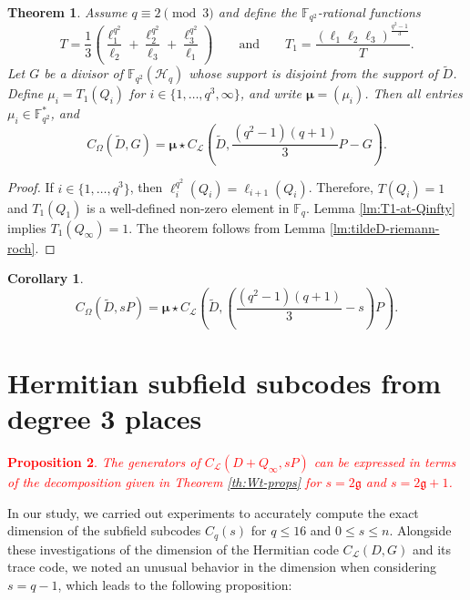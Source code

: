 \documentclass[11pt]{amsart}
\theoremstyle{plain}
\newtheorem{theorem}{Theorem}[section]
\newtheorem{proposition}[theorem]{Proposition}
\newtheorem*{corollary}{Corollary}
\theoremstyle{definition}
\theoremstyle{remark}
\newcommand{\g}{\mathfrak{g}}
\begin{document}
\begin{theorem}
Assume $q\equiv 2 \pmod3$ and define the $\mathbb{F}_{q^2}$-rational functions 
\[T=\frac{1}{3}\left(\frac{\ell_1^{q^2}}{\ell_2} + \frac{\ell_2^{q^2}}{\ell_3} + \frac{\ell_3^{q^2}}{\ell_1}\right) \qquad \text{and} \qquad T_1=\frac{(\ell_1\ell_{2}\ell_{3})^{\frac{q^2-1}{3}}}{T}.\]
Let $G$ be a divisor of $\mathbb{F}_{q^2}(\mathscr{H}_q)$ whose support is disjoint from the support of $\tilde{D}$. Define $\mu_i=T_1(Q_i)$ for $i \in \{1,\ldots,q^3,\infty\}$, and write $\boldsymbol{\mu}=(\mu_i)$. Then all entries $\mu_i\in \mathbb{F}_{q^2}^*$, and
\[C_\Omega(\tilde{D},G) = \boldsymbol{\mu} \star C_\mathscr{L}(\tilde{D},\frac{(q^2-1)(q+1)}{3}P-G).\]
\end{theorem}
\begin{proof}
If $i\in \{1,\ldots,q^3\}$, then $\ell_i^{q^2}(Q_i)=\ell_{i+1}(Q_i)$. Therefore, $T(Q_i)=1$ and $T_1(Q_1)$ is a well-defined non-zero element in $\mathbb{F}_q$. Lemma \ref{lm:T1-at-Qinfty} implies $T_1(Q_\infty)=1$. The theorem follows from Lemma \ref{lm:tildeD-riemann-roch}. 
\end{proof}

\begin{corollary}
\[C_\Omega(\tilde{D},sP) = \boldsymbol{\mu} \star C_\mathcal{L}\left(\tilde{D},\left(\frac{(q^2-1)(q+1)}{3}-s\right)P\right).\]
\end{corollary}



\section{Hermitian subfield subcodes from degree 3 places \label{sec:subf}}


\textcolor{red}{\begin{proposition}
	The generators of $C_{\mathcal{L}}\left(D+Q_{\infty}, s P\right)$ can be expressed in terms of the decomposition given in Theorem \ref{th:Wt-props} for $s=2 \g$ and $s=2 \g+1$.
\end{proposition}}

In our study, we carried out experiments to accurately compute the exact dimension of the subfield subcodes $ C_{q}(s) $ for $ q \leq 16 $ and $0 \leq s \leq n$. Alongside these investigations of the dimension of the Hermitian code $ C_{\mathcal{L}}(D, G) $ and its trace code, we noted an unusual behavior in the dimension when considering $s = q - 1 $, which leads to the following proposition:
\end{document}
